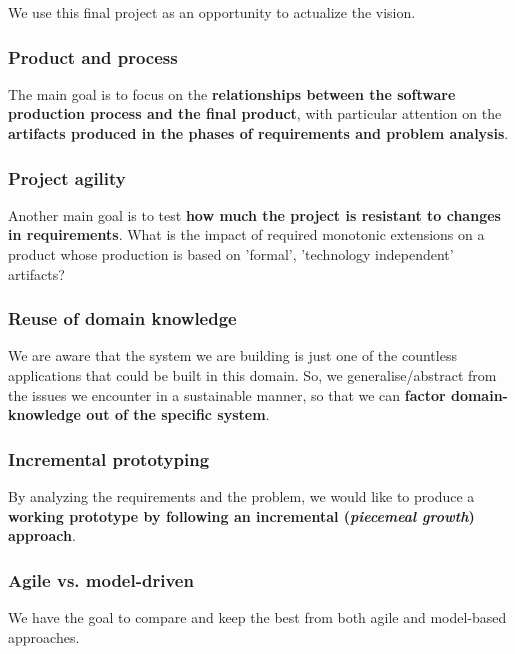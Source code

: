 \documentclass[11pt]{article}
\begin{document}
 We use this final project as an opportunity to actualize the vision.\\

\subsubsection*{Product and process}

The main goal is to focus on the \textbf{relationships between the software
production process and the final product}, with particular attention on the
\textbf{artifacts produced in the phases of requirements and problem analysis}.

\subsubsection*{Project agility}

Another main goal is to test \textbf{how much the project is resistant to
changes in requirements}. What is the impact of required monotonic extensions 
on a product whose production is based on 'formal', 'technology independent'
artifacts?

\subsubsection*{Reuse of domain knowledge}

We are aware that the system we are building is just one of the countless
applications that could be built in this domain. So, we generalise/abstract from
the issues we encounter in a sustainable manner, so that we can \textbf{factor
domain-knowledge out of the specific system}.

\subsubsection*{Incremental prototyping}

By analyzing the requirements and the problem, we would like to produce a
\textbf{working prototype by following an incremental (\emph{piecemeal growth})
approach}.

\subsubsection*{Agile vs. model-driven}

We have the goal to compare and keep the best from both agile and model-based approaches.

\end{document}
